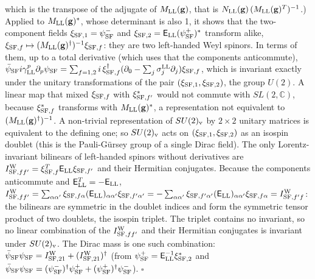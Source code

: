 \documentclass[
  10pt,
]{article}
\begin{document}
which is the transpose of the adjugate of \(M_{\rm LL}(\mathbf g)\),
that is \(N_{\rm LL}(\mathbf g)\,(M_{\rm LL}(\mathbf g)^T)^{-1}\).)
Applied to \(M_{\rm LL}(\mathbf g)^*\), whose determinant is also 1, it
shows that the two-component fields \(\xi_{{\rm SF},1}=\psi^-_{\rm SF}\)
and \(\xi_{{\rm SF},2}=\mathsf E_{\rm LL}(\psi^+_{\rm SF})^*\) transform
alike,
\(\xi_{{\rm SF},f}\mapsto(M_{\rm LL}(\mathbf g)^\dagger)^{-1}\xi_{{\rm SF},f}\):
they are two left-handed Weyl spinors. In terms of them, up to a total
derivative (which uses that the components anticommute),
\(\bar\psi_{\rm SF}i\gamma^p_{\rm LL}\partial_p\psi_{\rm SF}=\sum_{f=1,2}i\,\xi_{{\rm SF},f}^\dagger(\partial_0-\sum_j\sigma^{\rm LL}_j\partial_j)\xi_{{\rm SF},f}\),
which is invariant exactly under the unitary transformations of the pair
\((\xi_{{\rm SF},1},\xi_{{\rm SF},2})\), the group \(U(2)\). A linear
map that mixed \(\xi_{{\rm SF},f}\) with \(\xi_{{\rm SF},f'}^*\) would
not commute with \(SL(2,\mathbb C)\), because \(\xi_{{\rm SF},f}^*\)
transforms with \(M_{\rm LL}(\mathbf g)^*\), a representation not
equivalent to \((M_{\rm LL}(\mathbf g)^\dagger)^{-1}\). A non-trivial
representation of \(SU(2)_{\rm v}\) by \(2\times2\) unitary matrices is
equivalent to the defining one; so \(SU(2)_{\rm v}\) acts on
\((\xi_{{\rm SF},1},\xi_{{\rm SF},2})\) as an isospin doublet (this is
the Pauli-Gürsey group of a single Dirac field). The only
Lorentz-invariant bilinears of left-handed spinors without derivatives
are
\(I^{\rm W}_{{\rm SF},ff'}=\xi_{{\rm SF},f}^T\mathsf E_{\rm LL}\xi_{{\rm SF},f'}\)
and their Hermitian conjugates. Because the components anticommute and
\(\mathsf E_{\rm LL}^T=-\mathsf E_{\rm LL}\),
\(I^{\rm W}_{{\rm SF},ff'}=\sum_{\alpha\alpha'}\xi_{{\rm SF},f\alpha}(\mathsf E_{\rm LL})_{\alpha\alpha'}\xi_{{\rm SF},f'\alpha'}=-\sum_{\alpha\alpha'}\xi_{{\rm SF},f'\alpha'}(\mathsf E_{\rm LL})_{\alpha\alpha'}\xi_{{\rm SF},f\alpha}=I^{\rm W}_{{\rm SF},f'f}\):
the bilinears are symmetric in the doublet indices and form the
symmetric tensor product of two doublets, the isospin triplet. The
triplet contains no invariant, so no linear combination of the
\(I^{\rm W}_{{\rm SF},ff'}\) and their Hermitian conjugates is invariant
under \(SU(2)_{\rm v}\). The Dirac mass is one such combination:
\(\bar\psi_{\rm SF}\psi_{\rm SF}=I^{\rm W}_{{\rm SF},21}+(I^{\rm W}_{{\rm SF},21})^\dagger\)
(from \(\psi^+_{\rm SF}=\mathsf E_{\rm LL}^{-1}\xi_{{\rm SF},2}^*\) and
\(\bar\psi_{\rm SF}\psi_{\rm SF}=(\psi^-_{\rm SF})^\dagger\psi^+_{\rm SF}+(\psi^+_{\rm SF})^\dagger\psi^-_{\rm SF}\)).
\(\square\)
\end{document}
